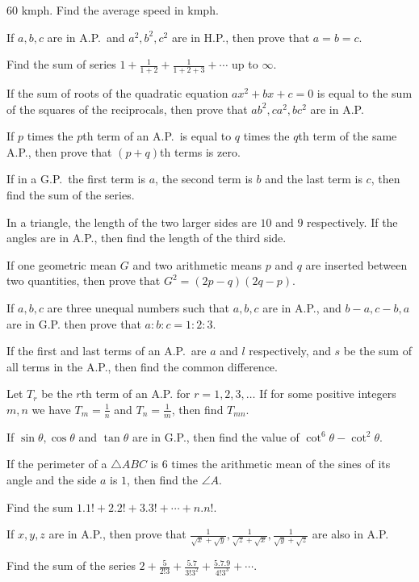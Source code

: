   $60$ kmph. Find the average speed in kmph.
\item If $a, b, c$ are in A.P.\ and $a^2, b^2, c^2$ are in H.P., then prove that $a = b = c$.
\item Find the sum of series $1 + \frac{1}{1 + 2} + \frac{1}{1 + 2 + 3} + \cdots$ up to $\infty$.
\item If the sum of roots of the quadratic equation $ax^2 + bx + c = 0$ is equal to the sum of the squares
  of the reciprocals, then prove that $ab^2, ca^2, bc^2$ are in A.P.
\item If $p$ times the $p$th term of an A.P.\ is equal to $q$ times the $q$th term of the same A.P., then
  prove that $(p + q)$th terms is zero.
\item If in a G.P.\ the first term is $a$, the second term is $b$ and the last term is $c$, then find the
  sum of the series.
\item In a triangle, the length of the two larger sides are $10$ and $9$ respectively. If the angles are in
  A.P., then find the length of the third side.
\item If one geometric mean $G$ and two arithmetic means $p$ and $q$ are inserted between two quantities,
  then prove that $G^2 = (2p - q)(2q - p)$.
\item If $a, b, c$ are three unequal numbers such that $a, b, c$ are in A.P., and $b - a, c - b, a$ are in
  G.P. then prove that $a:b:c = 1:2:3$.
\item If the first and last terms of an A.P.\ are $a$ and $l$ respectively, and $s$ be the sum of all terms
  in the A.P., then find the common difference.
\item Let $T_r$ be the $r$th term of an A.P. for $r = 1, 2, 3, \ldots$ If for some positive integers $m, n$
  we have $T_m = \frac{1}{n}$ and $T_n = \frac{1}{m}$, then find $T_{mn}$.
\item If $\sin\theta, \cos\theta$ and $\tan\theta$ are in G.P., then find the value of $\cot^6\theta
  - \cot^2\theta$.
\item If the perimeter of a $\triangle ABC$ is $6$ times the arithmetic mean of the sines of its angle and
  the side $a$ is $1$, then find the $\angle A$.
\item Find the sum $1.1! + 2.2! + 3.3! + \cdots + n.n!$.
\item If $x, y, z$ are in A.P., then prove that $\frac{1}{\sqrt{x} + \sqrt{y}}, \frac{1}{\sqrt{z}
  + \sqrt{x}}, \frac{1}{\sqrt{y} + \sqrt{z}}$ are also in A.P.
\item Find the sum of the series $2 + \frac{5}{2!3} + \frac{5.7}{3!3^2} + \frac{5.7.9}{4!3^3} + \cdots$.
